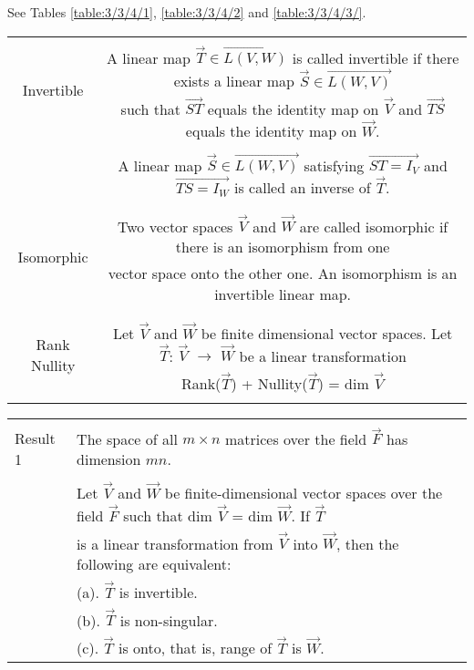 See Tables \ref{table:3/3/4/1},
\ref{table:3/3/4/2} and 
\ref{table:3/3/4/3/}.

\begin{table*}[!ht]
\resizebox{2\columnwidth}{!}
{
		\begin{tabular}{|c|c|}
			\hline
			\multirow{3}{*}{Invertible} & \\
			& A linear map $\vec{T}\in \vec{L(V,W)}$ is called invertible if there exists a linear map $\vec{S}\in \vec{L(W,V)}$ \\
			Linear Map & such that $\vec{ST}$ equals the identity map on $\vec{V}$ and $\vec{TS}$ equals the identity map on $\vec{W}$. \\
			& \\
			& A linear map $\vec{S}\in \vec{L(W,V)}$ satisfying $\vec{ST=I_{V}}$ and $\vec{TS=I_{W}}$ is called an inverse of $\vec{T}$.\\
			& \\
			\hline
			\multirow{3}{*}{Isomorphic} & \\
			& Two vector spaces $\vec{V}$ and $\vec{W}$ are called isomorphic if there is an isomorphism from one \\
			Vector Spaces & vector space onto the other one. An isomorphism is an invertible linear map. \\
			& \\
			\hline
			\multirow{3}{*}{Rank Nullity} & \\
			  & Let $\vec{V}$ and $\vec{W}$ be finite dimensional vector spaces. Let $\vec{T}$: $\vec{V}$ $\to$ $\vec{W}$ be a linear transformation \\
			Theorem &  Rank($\vec{T}$) + Nullity($\vec{T}$) = dim $\vec{V}$\\
			& \\
			\hline	
		\end{tabular}
}
\caption{Definition}
\label{table:3/3/4/1}
\end{table*}
\begin{table*}[!ht]
\resizebox{2\columnwidth}{!}
{
	\begin{tabular}{|l|l|}
		\hline
		\multirow{3}{*}{Result 1} & \\
		& The space of all $m \times n$ matrices over the field $\vec{F}$ has dimension $mn$.\\
		\hline
		\multirow{3}{*}{Result 2} & \\
	   & Let $\vec{V}$ and $\vec{W}$ be finite-dimensional vector spaces over the field $\vec{F}$ such that dim $\vec{V}$ = dim $\vec{W}$. If $\vec{T}$ \\
	   & is a linear transformation from $\vec{V}$ into $\vec{W}$, then the following are equivalent:\\
	   & (a). $\vec{T}$ is invertible. \\
	   & (b). $\vec{T}$ is non-singular.\\
	   & (c). $\vec{T}$ is onto, that is, range of $\vec{T}$ is $\vec{W}$.\\
	   \hline	
	\end{tabular}
}
\caption{Results Used}
\label{table:3/3/4/2}
\end{table*}
